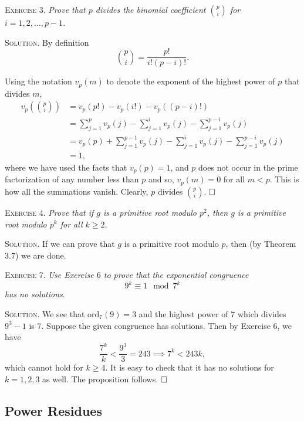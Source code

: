 \documentclass[11pt, leqno]{article}
\newcommand{\done}{\ensuremath{\hfill\square}}
\begin{document}
\textsc{Exercise 3}. \emph{Prove that $p$ divides the binomial coefficient $\binom{p}{i} $ for $i=1,2,\ldots, p-1$.}

\textsc{Solution}. By definition 
\begin{displaymath}
\binom{p}{i} = \frac{p!}{i!(p-i)!}.
\end{displaymath}

Using the notation $v_p(m)$ to denote the exponent of the highest power of $p$ that divides $m$, 
\begin{align*}
  v_p(\binom{p}{i}) &= v_p(p!) - v_p(i!) - v_p((p-i)!) \\
                    &= \sum_{j=1}^p v_p(j) - \sum_{j=1}^i v_p(j) - \sum_{j=1}^{p-i} v_p(j) \\
                    &= v_p(p) + \sum_{j=1}^{p-1} v_p(j) - \sum_{j=1}^i v_p(j) - \sum_{j=1}^{p-i} v_p(j) \\
                    &= 1,
\end{align*}
where we have used the facts that $v_p(p) = 1$, and $p$ does not occur in the prime factorization of any number less than $p$ and so, $v_p(m) = 0$ for all $m < p$. This is how all the summations vanish. Clearly, $p$ divides $\binom{p}{i}$. \done

\textsc{Exercise 4}. \emph{Prove that if $g$ is a primitive root modulo $p^2$, then $g$ is a primitive root modulo $p^k$ for all $k\geq 2$.}

\textsc{Solution}. If we can prove that $g$ is a primitive root modulo $p$, then (by Theorem $3.7$) we are done.

\textsc{Exercise 7}. \emph{Use Exercise $6$ to prove that the exponential congruence 
\begin{displaymath}
9^k \equiv 1 \mod 7^k
\end{displaymath}
has no solutions}.

\textsc{Solution.} We see that ord$_7(9) = 3$ and the highest power of $7$ which divides $9^3-1$ is $7$. Suppose the given congruence has solutions. Then by Exercise $6$, we have 
\begin{displaymath}
\frac{7^k}{k} < \frac{9^3}{3} = 243 \implies 7^k < 243k,
\end{displaymath}
which cannot hold for $k\geq 4$. It is easy to check that it has no solutions for $k=1,2,3$ as well. The proposition follows. \done

\subsection{Power Residues}
\end{document}
